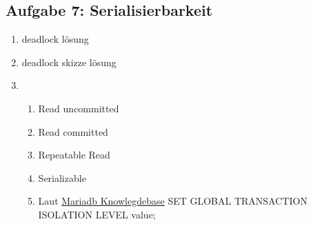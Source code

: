 \subsection{Aufgabe 7: Serialisierbarkeit}
\label{sec:Aufgabe7}
\begin{enumerate}[label=\alph*)]
    \item deadlock lösung
    \item deadlock skizze lösung
    \item
        \begin{enumerate}[label=\arabic*]
            \item Read uncommitted
            \item Read committed
            \item Repeatable Read
            \item Serializable
            \item Laut \href{https://mariadb.com/kb/en/set-transaction/}
                {Mariadb Knowlegdebase} SET GLOBAL TRANSACTION ISOLATION LEVEL value;
        \end{enumerate}
\end{enumerate}
